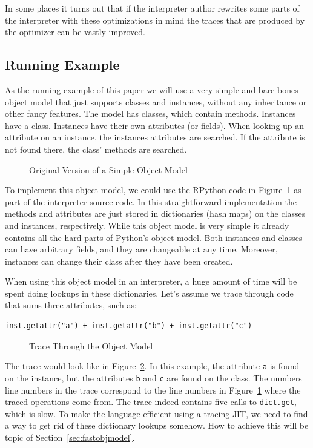 \documentclass{sigplanconf}
\begin{document}
In some places it turns out that if the interpreter author rewrites some parts
of the interpreter with these optimizations in mind the traces that are produced
by the optimizer can be vastly improved.

\subsection{Running Example}
\label{sub:running}

As the running example of this paper we will use a very simple and bare-bones
object model that just supports classes and instances, without any
inheritance or other fancy features. The model has classes, which contain methods.
Instances have a class. Instances have their own attributes (or fields). When looking up an
attribute on an instance, the instances attributes are searched. If the
attribute is not found there, the class' methods are searched.

\begin{figure}

\caption{Original Version of a Simple Object Model}
\label{fig:interpreter-slow}
\end{figure}


To implement this object model, we could use the RPython code in
Figure~\ref{fig:interpreter-slow} as part of the interpreter source code.
In this straightforward implementation the methods and attributes are just
stored in dictionaries (hash maps) on the classes and instances, respectively.
While this object model is very
simple it already contains all the hard parts of Python's object model. Both
instances and classes can have arbitrary fields, and they are changeable at
any time.  Moreover, instances can change their class after they have been
created.

When using this object model in
an interpreter, a huge amount of time will be spent doing lookups in these
dictionaries.
Let's assume we trace through code that sums three attributes, such as:

\begin{lstlisting}[mathescape,basicstyle=\ttfamily]
inst.getattr("a") + inst.getattr("b") + inst.getattr("c")
\end{lstlisting}

\begin{figure}

\caption{Trace Through the Object Model}
\label{fig:trace1}
\end{figure}

The trace would look like in Figure~\ref{fig:trace1}. In this example, the
attribute \texttt{a} is found on the instance, but the
attributes \texttt{b} and \texttt{c} are found on the class. The numbers line
numbers in the trace correspond to the line numbers in
Figure~\ref{fig:interpreter-slow} where the traced operations come from. The
trace indeed contains
five calls to \texttt{dict.get}, which is slow. To make the language efficient
using a tracing JIT, we need to find a way to get rid of these dictionary
lookups somehow. How to achieve this will be topic of
Section~\ref{sec:fastobjmodel}.
\end{document}
